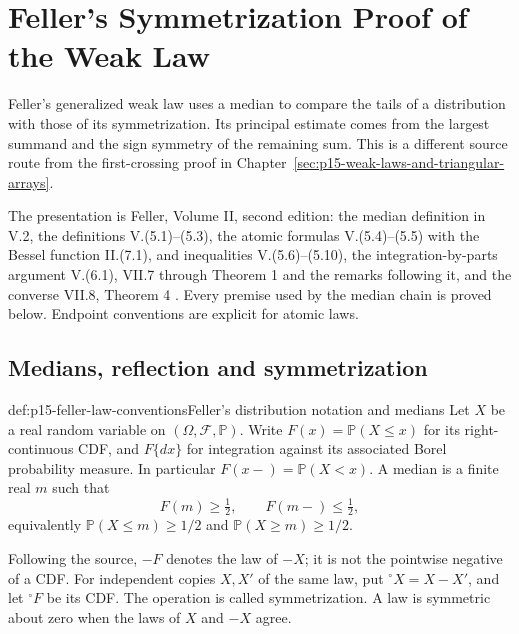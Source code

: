 \chapter{Feller's Symmetrization Proof of the Weak Law}
\label{sec:p15-feller-weak-law-presentation}

Feller's generalized weak law uses a median to compare the tails of a
distribution with those of its symmetrization. Its principal estimate
comes from the largest summand and the sign symmetry of the remaining
sum. This is a different source route from the first-crossing proof in
Chapter~\ref{sec:p15-weak-laws-and-triangular-arrays}.

The presentation is Feller, Volume II, second edition: the median
definition in V.2, the definitions V.(5.1)--(5.3), the atomic
formulas V.(5.4)--(5.5) with the Bessel function II.(7.1), and
inequalities V.(5.6)--(5.10),
the integration-by-parts argument V.(6.1), VII.7 through Theorem 1 and
the remarks following it, and the converse VII.8, Theorem 4
\cite[pp.~58, 137, 148--150, 234--236, 241]{Feller1971ProbabilityII}.
Every premise used by the median chain is proved below. Endpoint
conventions are explicit for atomic laws.

\section{Medians, reflection and symmetrization}
\label{sec:p15-feller-median-symmetrization}

\begin{hbdefinition}{def:p15-feller-law-conventions}{Feller's distribution notation and medians}
Let \(X\) be a real random variable on
\((\Omega,\mathcal F,\mathbb P)\). Write
\(F(x)=\mathbb P(X\leq x)\) for its right-continuous CDF,
and \(F\{dx\}\) for integration against its associated Borel
probability measure. In particular
\(F(x-)=\mathbb P(X<x)\).
A median is a finite real \(m\) such that
\[
 F(m)\geq\tfrac12,\qquad F(m-)\leq\tfrac12,
\]
equivalently \(\mathbb P(X\leq m)\geq1/2\) and
\(\mathbb P(X\geq m)\geq1/2\).

Following the source, \(-F\) denotes the law of \(-X\); it is
not the pointwise negative of a CDF. For independent copies \(X,X'\)
of the same law, put
\({}^{\circ}X=X-X'\), and let \({}^{\circ}F\) be its CDF.
The operation is called symmetrization. A law is symmetric about zero
when the laws of \(X\) and \(-X\) agree.
\end{hbdefinition}

